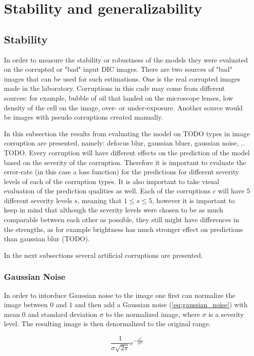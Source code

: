\section{Stability and generalizability}
\subsection{Stability}
In order to measure the stability or robustness of the models they were evaluated on the corrupted or "bad" input DIC images. There are two sources of "bad" images that can be used for such estimations. One is the real corrupted images made in the laboratory. Corruptions in this cade may come from different sources: for example, bubble of oil that landed on the microscope lenses, low density of the cell on the image, over- or under-exposure. Another source would be images with pseudo corruptions created manually. 

In this subsection the results from evaluating the model on TODO types in image corruption are presented, namely: defocus blur, gaussian bluer, gaussian noise, .. TODO. Every corruption will have different effects on the prediction of the model based on the severity of the corruption. Therefore it is important to evaluate the error-rate (in this case a loss function) for the predictions for different severity levels of each of the corruption types. It is also important to take visual evaluation of the prediction qualities as well. Each of the corruptions $c$ will have 5 different severity levels $s$, meaning that $1 \leq s \leq 5$, however it is important to keep in mind that although the severity levels were chosen to be as much comparable between each other as possible, they still might have differences in the strengths, as for example brightness has much stronger effect on predictions than gaussian blur (TODO).

In the next subsections several artificial corruptions are presented.
\subsubsection{Gaussian Noise}
In order to intorduce Gaussian noise to the image one first can normalize the image between $0$ and $1$ and then add a Gaussian noise (\ref{eq:gaussian_noise}) with mean $0$ and standard deviation $\sigma$ to the normalized image, where $\sigma$ is a severity level. The resulting image is then denormalized to the original range. 

\begin{equation}
    \label{eq:gaussian_noise}
    \frac{1}{\sigma\sqrt{2\pi}} e^{-\frac{x^2}{2\sigma^2}}
\end{equation}

